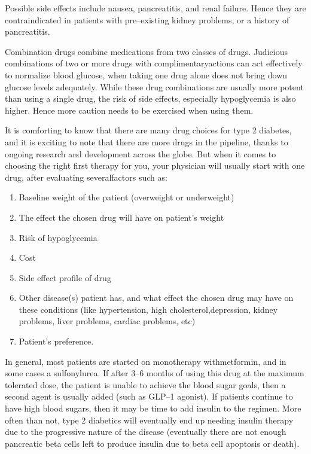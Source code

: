 Possible side effects include nausea, pancreatitis, and renal failure. Hence they are contraindicated in patients with pre–existing kidney problems, or a history of pancreatitis.


Combination drugs combine medications from two classes of drugs. Judicious combinations of two or more drugs with complimentary\break actions can act effectively to normalize blood glucose, when taking one drug alone does not bring down glucose levels adequately. While these drug combinations are usually more potent than using a single drug, the risk of side effects, especially hypoglycemia is also higher. Hence more caution needs to be exercised when using them.


It is comforting to know that there are many drug choices for type 2 diabetes, and it is exciting to note that there are more drugs in the pipeline, thanks to ongoing research and development across the globe. But when it comes to choosing the right first therapy for you, your physician will usually start with one drug, after evaluating several\break factors such as:

\vspace{-\topsep}
\begin{enumerate}[•]
\itemsep=0pt
\item Baseline weight of the patient (overweight or underweight)
\item The effect the chosen drug will have on patient’s weight
\item Risk of hypoglycemia
\item Cost
\item Side effect profile of drug
\item Other disease(s) patient has, and what effect the chosen drug may have on these conditions (like hypertension, high cholesterol,\break depression, kidney problems, liver problems, cardiac problems, etc)
\item Patient’s preference.
\end{enumerate}
\vspace{-\topsep}

\clearpage

In general, most patients are started on monotherapy with\break metformin, and in some cases a sulfonylurea. If after 3–6 months of using this drug at the maximum tolerated dose, the patient is unable to achieve the blood sugar goals, then a second agent is usually added (such as GLP–1 agonist). If patients continue to have high blood sugars, then it may be time to add insulin to the regimen. More often than not, type 2 diabetics will eventually end up needing insulin therapy due to the progressive nature of the disease (eventually there are not enough pancreatic beta cells left to produce insulin due to beta cell apoptosis or death).

